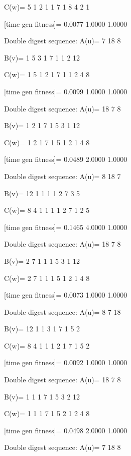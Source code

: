 C(w)=
     5     1     2     1     1     7     1     8     4     2     1

[time gen fitness]=
    0.0077    1.0000    1.0000

Double digest sequence:
A(u)=
     7    18     8

B(v)=
     1     5     3     1     7     1     1     2    12

C(w)=
     1     5     1     2     1     7     1     1     2     4     8

[time gen fitness]=
    0.0099    1.0000    1.0000

Double digest sequence:
A(u)=
    18     7     8

B(v)=
     1     2     1     7     1     5     3     1    12

C(w)=
     1     2     1     7     1     5     1     2     1     4     8

[time gen fitness]=
    0.0489    2.0000    1.0000

Double digest sequence:
A(u)=
     8    18     7

B(v)=
    12     1     1     1     1     2     7     3     5

C(w)=
     8     4     1     1     1     1     2     7     1     2     5

[time gen fitness]=
    0.1465    4.0000    1.0000

Double digest sequence:
A(u)=
    18     7     8

B(v)=
     2     7     1     1     1     5     3     1    12

C(w)=
     2     7     1     1     1     5     1     2     1     4     8

[time gen fitness]=
    0.0073    1.0000    1.0000

Double digest sequence:
A(u)=
     8     7    18

B(v)=
    12     1     1     3     1     7     1     5     2

C(w)=
     8     4     1     1     1     2     1     7     1     5     2

[time gen fitness]=
    0.0092    1.0000    1.0000

Double digest sequence:
A(u)=
    18     7     8

B(v)=
     1     1     1     7     1     5     3     2    12

C(w)=
     1     1     1     7     1     5     2     1     2     4     8

[time gen fitness]=
    0.0498    2.0000    1.0000

Double digest sequence:
A(u)=
     7    18     8

